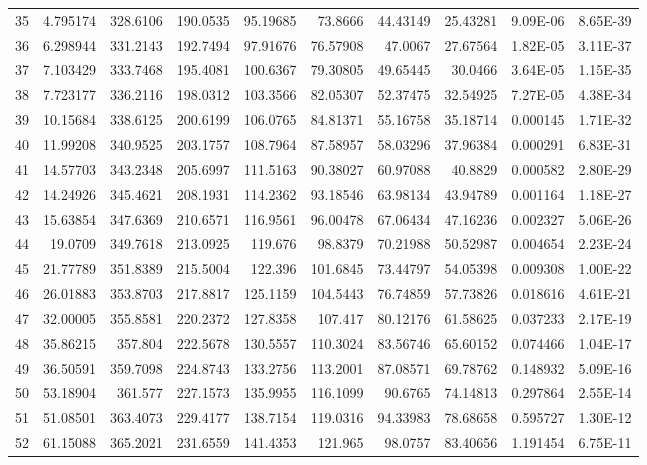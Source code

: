 \documentclass[a4paper]{article}
\begin{document}
{\begin{tabular}{|l|r|r|r|r|r|r|r|r|r|}
    {35} & 4.795174 & 328.6106 & 190.0535 & 95.19685 & 73.8666 & 44.43149 & 25.43281 & 9.09E-06 & 8.65E-39 \\
    {36} & 6.298944 & 331.2143 & 192.7494 & 97.91676 & 76.57908 & 47.0067 & 27.67564 & 1.82E-05 & 3.11E-37 \\
    {37} & 7.103429 & 333.7468 & 195.4081 & 100.6367 & 79.30805 & 49.65445 & 30.0466 & 3.64E-05 & 1.15E-35 \\
    {38} & 7.723177 & 336.2116 & 198.0312 & 103.3566 & 82.05307 & 52.37475 & 32.54925 & 7.27E-05 & 4.38E-34 \\
    {39} & 10.15684 & 338.6125 & 200.6199 & 106.0765 & 84.81371 & 55.16758 & 35.18714 & 0.000145 & 1.71E-32 \\
    {40} & 11.99208 & 340.9525 & 203.1757 & 108.7964 & 87.58957 & 58.03296 & 37.96384 & 0.000291 & 6.83E-31 \\
    {41} & 14.57703 & 343.2348 & 205.6997 & 111.5163 & 90.38027 & 60.97088 & 40.8829 & 0.000582 & 2.80E-29 \\
    {42} & 14.24926 & 345.4621 & 208.1931 & 114.2362 & 93.18546 & 63.98134 & 43.94789 & 0.001164 & 1.18E-27 \\
    {43} & 15.63854 & 347.6369 & 210.6571 & 116.9561 & 96.00478 & 67.06434 & 47.16236 & 0.002327 & 5.06E-26 \\
    {44} & 19.0709 & 349.7618 & 213.0925 & 119.676 & 98.8379 & 70.21988 & 50.52987 & 0.004654 & 2.23E-24 \\
    {45} & 21.77789 & 351.8389 & 215.5004 & 122.396 & 101.6845 & 73.44797 & 54.05398 & 0.009308 & 1.00E-22 \\
    {46} & 26.01883 & 353.8703 & 217.8817 & 125.1159 & 104.5443 & 76.74859 & 57.73826 & 0.018616 & 4.61E-21 \\
    {47} & 32.00005 & 355.8581 & 220.2372 & 127.8358 & 107.417 & 80.12176 & 61.58625 & 0.037233 & 2.17E-19 \\
    {48} & 35.86215 & 357.804 & 222.5678 & 130.5557 & 110.3024 & 83.56746 & 65.60152 & 0.074466 & 1.04E-17 \\
    {49} & 36.50591 & 359.7098 & 224.8743 & 133.2756 & 113.2001 & 87.08571 & 69.78762 & 0.148932 & 5.09E-16 \\
    {50} & 53.18904 & 361.577 & 227.1573 & 135.9955 & 116.1099 & 90.6765 & 74.14813 & 0.297864 & 2.55E-14 \\
    {51} & 51.08501 & 363.4073 & 229.4177 & 138.7154 & 119.0316 & 94.33983 & 78.68658 & 0.595727 & 1.30E-12 \\
    {52} & 61.15088 & 365.2021 & 231.6559 & 141.4353 & 121.965 & 98.0757 & 83.40656 & 1.191454 & 6.75E-11 \\

\end{tabular}}
\end{document}
